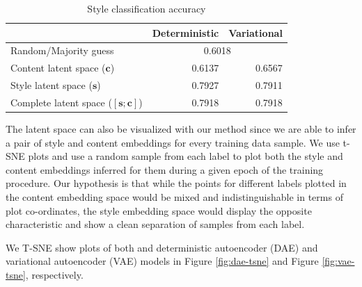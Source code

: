 \begin{table}[ht]
	\centering
	\begin{tabular}{| l | r | r |}
		\hline
		                                        & \textbf{Deterministic}       & \textbf{Variational} \\
		\hline \hline
		Random/Majority guess                   & \multicolumn{2}{|c|}{0.6018}                        \\ \hline \hline
		Content latent space  ($\bm c$)         & 0.6137                       & 0.6567               \\ \hline
		Style latent space ($\bm s$)            & 0.7927                       & 0.7911               \\ \hline
		Complete latent space ($[\bm s;\bm c]$) & 0.7918                       & 0.7918               \\
		\hline
	\end{tabular}
	\caption{Style classification accuracy}
	\label{tab:latent-space-classification}
\end{table}

The latent space can also be visualized with our method since we are able to infer a pair of style and content embeddings for every training data sample. We use t-SNE plots \cite{maaten2008visualizing} and use a random sample from each label to plot both the style and content embeddings inferred for them during a given epoch of the training procedure. Our hypothesis is that while the points for different labels plotted in the content embedding space would be mixed and indistinguishable in terms of plot co-ordinates, the style embedding space would display the opposite characteristic and show a clean separation of samples from each label.

We T-SNE show plots of both and deterministic autoencoder (DAE) and variational autoencoder (VAE) models in Figure \ref{fig:dae-tsne} and Figure \ref{fig:vae-tsne}, respectively.

